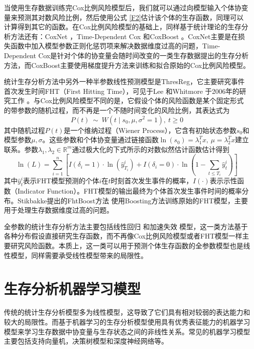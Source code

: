 当使用生存数据训练完Cox比例风险模型后，我们就可以通过向模型输入个体协变量来预测其对数风险比例，然后使用公式 \eqref{F2}估计该个体的生存函数，同理可以计算得到其它的函数。在Cox比例风险模型的基础上，同样基于统计理论的生存分析方法还有：CoxNet ，Time-Dependent Cox 和CoxBoost 。CoxNet主要是在损失函数中加入模型参数正则化惩罚项来解决数据维度过高的问题，Time-Dependent Cox是针对个体的协变量会随时间改变的一类生存数据提出的生存分析方法，而CoxBoost主要使用梯度提升方法来训练和拟合原始的Cox比例风险模型。

统计生存分析方法中另外一种半参数线性预测模型是ThresReg，它主要研究事件首次发生时间FHT（First Hitting Time），可见于Lee 和Whitmore 于2006年的研究工作 。与Cox比例风险模型不同的是，它假设个体的风险函数是某个固定形式的带参数的随机过程，而不再是一个不随时间变化的风险比例，其表达式为
\begin{equation}
P(t)\ \sim \ W(t \mid s_0, \mu, \sigma^2=1),\ t\ge 0 \label{F7}
\end{equation}
其中随机过程$P(t)$是一个维纳过程（Wiener Process），它含有初始状态参数$s_0$和模型参数$\mu, \sigma$。这些参数和个体协变量通过链接函数$\ln⁡(s_0 )=\lambda_1^T x,\ \mu = \lambda_2^T x$建立联系。参数$\lambda_1,\lambda_2\in \mathbb{R}^m$通过极大化的下式所示的对数似然估计函数估计得到
\begin{equation}
\ln(L)=\sum_{i=1}^{n} \left[ I(\delta_i=1)\cdot \ln(\hat{y}_{T_i}^i) + I(\delta_i=0) \cdot \ln(1-\sum_{t\le T_i}\hat{y}_t^i) \right] \label{F8}
\end{equation}
其中$\hat{y}_t^i$表示FHT模型预测的个体$i$在$t$时刻首次发生事件的概率，$I(\cdot)$表示示性函数（Indicator Function）。FHT模型的输出最终为个体首次发生事件时间的概率分布。Stikbakke提出的FhtBoost方法 使用Boosting方法训练原始的FHT模型，主要用于处理生存数据维度过高的问题。

全参数的统计生存分析方法主要包括线性回归 和加速失效 模型，这一类方法基于各种分布假设直接研究生存函数，而不再像Cox比例风险模型或者FHT模型一样主要研究风险函数。本质上，这一类可以用于预测个体生存函数的全参数模型也是线性模型，同样需要承受线性模型带来的局限性。

\section{生存分析机器学习模型}

传统的统计生存分析模型多为线性模型，这导致了它们具有相对较弱的表达能力和较大的局限性。而基于机器学习的生存分析模型使用具有优秀表征能力的机器学习模型来学习生存数据中协变量与生存状态之间的非线性关系。常见的机器学习模型主要包括支持向量机，决策树模型和深度神经网络等。

